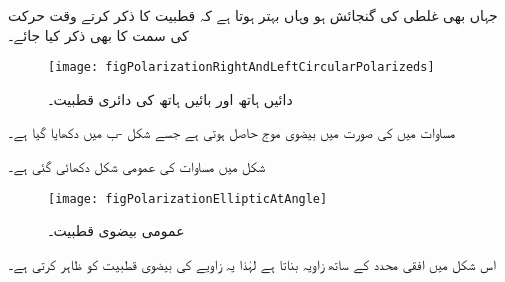 جہاں بھی غلطی کی گنجائش ہو وہاں بہتر ہوتا ہے کہ قطبیت کا ذکر کرتے وقت حرکت کی سمت کا بھی ذکر کیا جائے۔

\begin{figure}
\centering
\texttt{[image: figPolarizationRightAndLeftCircularPolarizeds]}
\caption{دائیں ہاتھ اور بائیں ہاتھ کی دائری قطبیت۔}
\label{شکل_قطبیت_دایاں_بایاں_ہاتھ_دائری}
\end{figure}

مساوات  میں  کی صورت میں بیضوی موج حاصل ہوتی ہے جسے شکل -ب میں دکھایا گیا ہے۔

شکل  میں مساوات  کی عمومی شکل دکھائی گئی ہے۔
\begin{figure}
\centering
\texttt{[image: figPolarizationEllipticAtAngle]}
\caption{عمومی بیضوی قطبیت۔}
\label{شکل_قطبیت_عمومی_بیضوی}
\end{figure}
اس شکل میں  افقی محدد کے ساتھ  زاویہ بناتا ہے لہٰذا یہ  زاویے کی بیضوی قطبیت کو ظاہر کرتی ہے۔

